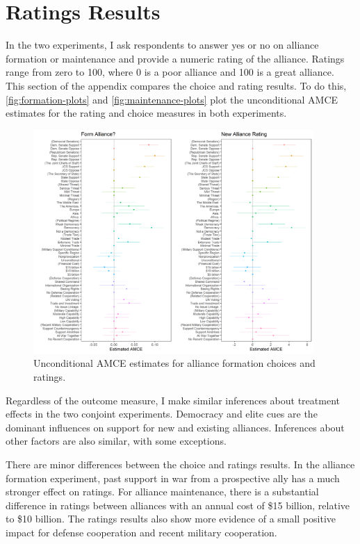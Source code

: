 \documentclass[12pt]{article}
\begin{document}
\newpage


\section{Ratings Results}

In the two experiments, I ask respondents to answer yes or no on alliance formation or maintenance and provide a numeric rating of the alliance. 
Ratings range from zero to 100, where 0 is a poor alliance and 100 is a great alliance. 
This section of the appendix compares the choice and rating results. 
To do this, \autoref{fig:formation-plots} and \autoref{fig:maintenance-plots} plot the unconditional AMCE estimates for the rating and choice measures in both experiments.  


\begin{figure}
	\centering
		\includegraphics[width=0.95\textwidth]{formation-plots.png}
	\caption{Unconditional AMCE estimates for alliance formation choices and ratings.}
	\label{fig:formation-plots}
\end{figure}


Regardless of the outcome measure, I make similar inferences about treatment effects in the two conjoint experiments. 
Democracy and elite cues are the dominant influences on support for new and existing alliances. 
Inferences about other factors are also similar, with some exceptions. 


There are minor differences between the choice and ratings results. 
In the alliance formation experiment, past support in war from a prospective ally has a much stronger effect on ratings. 
For alliance maintenance, there is a substantial difference in ratings between alliances with an annual cost of \$15 billion, relative to \$10 billion. 
The ratings results also show more evidence of a small positive impact for defense cooperation and recent military cooperation. 
\end{document}
